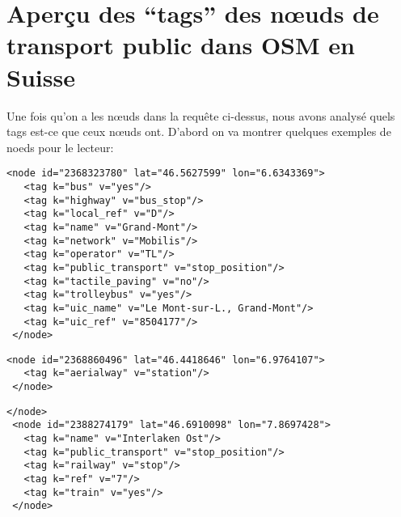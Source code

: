 \section{Aperçu des ``tags'' des nœuds de transport public dans OSM en Suisse}
Une fois qu'on a les nœuds dans la requête ci-dessus, nous avons analysé quels tags est-ce que ceux nœuds ont. 
D'abord on va montrer quelques exemples de noeds pour le lecteur:
\begin{tcolorbox}[colback=gray!10, colframe=brown, title=OSM N\oe ud: Grand-Mont]
\begin{verbatim}
<node id="2368323780" lat="46.5627599" lon="6.6343369">
   <tag k="bus" v="yes"/>
   <tag k="highway" v="bus_stop"/>
   <tag k="local_ref" v="D"/>
   <tag k="name" v="Grand-Mont"/>
   <tag k="network" v="Mobilis"/>
   <tag k="operator" v="TL"/>
   <tag k="public_transport" v="stop_position"/>
   <tag k="tactile_paving" v="no"/>
   <tag k="trolleybus" v="yes"/>
   <tag k="uic_name" v="Le Mont-sur-L., Grand-Mont"/>
   <tag k="uic_ref" v="8504177"/>
 </node>
\end{verbatim}
\end{tcolorbox}
\begin{tcolorbox}[colback=gray!10, colframe=brown, title=OSM N\oe ud sans nom]
\begin{verbatim}
<node id="2368860496" lat="46.4418646" lon="6.9764107">
   <tag k="aerialway" v="station"/>
 </node>
\end{verbatim}
\end{tcolorbox}
\begin{tcolorbox}[colback=gray!10, colframe=brown, title=OSM N\oe ud: Interlaken Ost]
\begin{verbatim}
</node>
 <node id="2388274179" lat="46.6910098" lon="7.8697428">
   <tag k="name" v="Interlaken Ost"/>
   <tag k="public_transport" v="stop_position"/>
   <tag k="railway" v="stop"/>
   <tag k="ref" v="7"/>
   <tag k="train" v="yes"/>
 </node>
\end{verbatim}
\end{tcolorbox}

